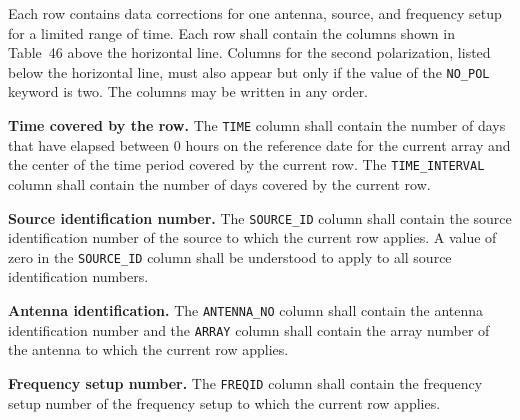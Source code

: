 \documentclass[twoside]{article}
\begin{document}
Each row contains data corrections for one antenna, source, and
frequency setup for a limited range of time.  Each row shall contain
the columns shown in Table~46 above the horizontal line.  Columns for
the second polarization, listed below the horizontal line, must also
appear but only if the value of the {\tt NO\_POL} keyword is two.  The
columns may be written in any order.

{\bf Time covered by the row.}  The {\tt TIME} column shall contain
the number of days that have elapsed between 0 hours on the reference
date for the current array and the center of the time period covered
by the current row. The {\tt TIME\_INTERVAL} column shall contain the
number of days covered by the current row.

{\bf Source identification number.}  The {\tt SOURCE\_ID} column shall
contain the source identification number of the source to which the
current row applies.  A value of zero in the {\tt SOURCE\_ID} column
shall be understood to apply to all source identification numbers.

{\bf Antenna identification.}  The {\tt ANTENNA\_NO} column shall
contain the antenna identification number and the {\tt ARRAY} column
shall contain the array number of the antenna to which the current row
applies.

{\bf Frequency setup number.}  The {\tt FREQID} column shall contain
the frequency setup number of the frequency setup to which the current
row applies.
\end{document}
